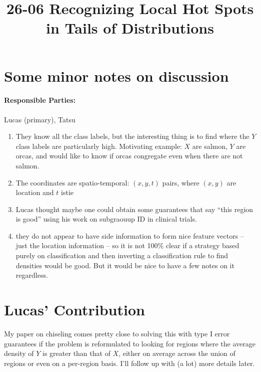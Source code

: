 \documentclass[11pt]{article}
\begin{document}
\title{26-06 Recognizing Local Hot Spots in Tails of Distributions}

\maketitle

\section{Some minor notes on discussion}

\paragraph{Responsible Parties:} Lucas (primary), Tatsu

\begin{enumerate}[1.]
\item They know all the class labels, but the interesting thing is to find
  where the $Y$ class labels are particularly high.
  Motivating example: $X$ are salmon, $Y$ are orcas, and would like to know
  if orcas congregate even when there are not salmon.
\item The coordinates are spatio-temporal: $(x, y, t)$ pairs, where $(x, y)$
  are location and $t$ istie
\item Lucas thought maybe one could obtain some guarantees that say ``this
  region is good'' using his work on subgraouup ID in clinical trials.
\item they do not appear to have side information to form nice
  feature vectors -- just the location information -- so it is not
  100\% clear if a strategy based purely on classification
  and then inverting a classification rule to find densities would
  be good.
  But it would be nice to have a few notes on it regardless.
\end{enumerate}

\section{Lucas' Contribution}
My paper on chiseling comes pretty close to solving this with type I error guarantees if the problem is reformulated to looking for regions where the average density of $Y$ is greater than that of $X$, either on average across the union of regions or even on a per-region basis. I'll follow up with (a lot) more details later.
\end{document}
